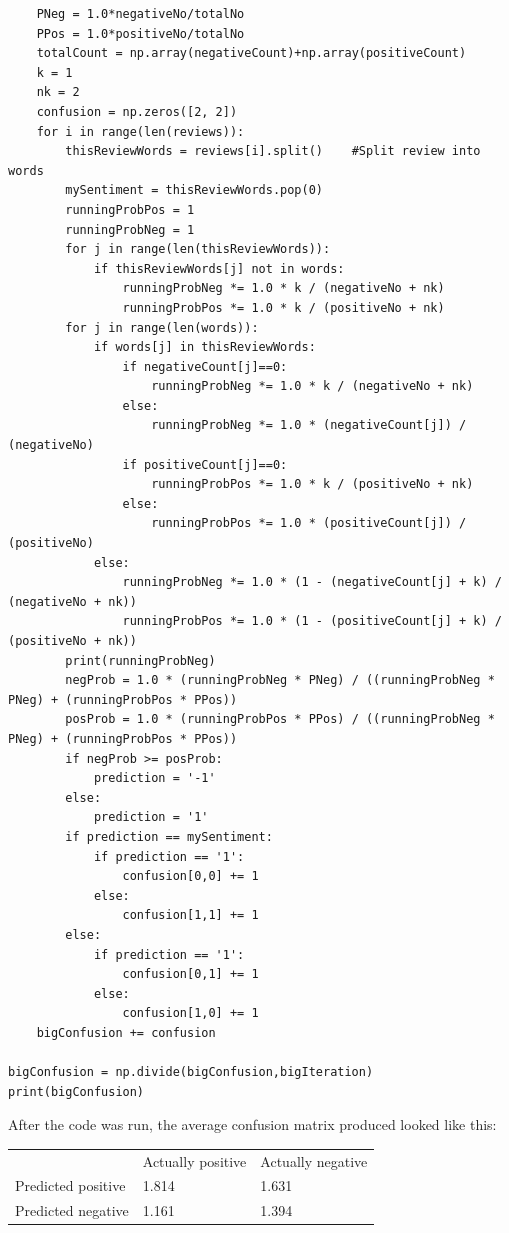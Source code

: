 \documentclass[10pt]{article}
\begin{document}
\begin{lstlisting}
    PNeg = 1.0*negativeNo/totalNo
    PPos = 1.0*positiveNo/totalNo
    totalCount = np.array(negativeCount)+np.array(positiveCount)
    k = 1
    nk = 2
    confusion = np.zeros([2, 2])
    for i in range(len(reviews)):
        thisReviewWords = reviews[i].split()    #Split review into words
        mySentiment = thisReviewWords.pop(0)
        runningProbPos = 1
        runningProbNeg = 1
        for j in range(len(thisReviewWords)):
            if thisReviewWords[j] not in words:
                runningProbNeg *= 1.0 * k / (negativeNo + nk)
                runningProbPos *= 1.0 * k / (positiveNo + nk)
        for j in range(len(words)):
            if words[j] in thisReviewWords:
                if negativeCount[j]==0:
                    runningProbNeg *= 1.0 * k / (negativeNo + nk)
                else:
                    runningProbNeg *= 1.0 * (negativeCount[j]) / (negativeNo)
                if positiveCount[j]==0:
                    runningProbPos *= 1.0 * k / (positiveNo + nk)
                else:
                    runningProbPos *= 1.0 * (positiveCount[j]) / (positiveNo)
            else:
                runningProbNeg *= 1.0 * (1 - (negativeCount[j] + k) / (negativeNo + nk))
                runningProbPos *= 1.0 * (1 - (positiveCount[j] + k) / (positiveNo + nk))
        print(runningProbNeg)
        negProb = 1.0 * (runningProbNeg * PNeg) / ((runningProbNeg * PNeg) + (runningProbPos * PPos))
        posProb = 1.0 * (runningProbPos * PPos) / ((runningProbNeg * PNeg) + (runningProbPos * PPos))
        if negProb >= posProb:
            prediction = '-1'
        else:
            prediction = '1'
        if prediction == mySentiment:
            if prediction == '1':
                confusion[0,0] += 1
            else:
                confusion[1,1] += 1
        else:
            if prediction == '1':
                confusion[0,1] += 1
            else:
                confusion[1,0] += 1
    bigConfusion += confusion

bigConfusion = np.divide(bigConfusion,bigIteration)
print(bigConfusion)
\end{lstlisting}
\newpage
After the code was run, the average confusion matrix produced looked like this:
\begin{table}[h]
\centering
\begin{tabular}{lll}
                   & Actually positive & Actually negative \\
Predicted positive & 1.814             & 1.631 \\
Predicted negative & 1.161             & 1.394            
\end{tabular}
\end{table}\\
\end{document}
